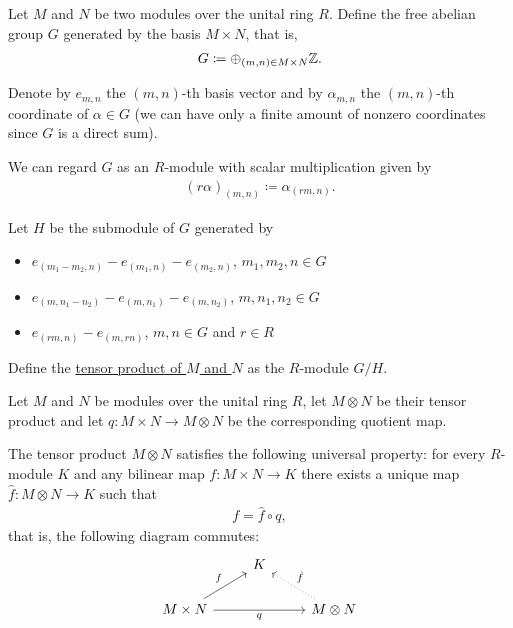 \begin{definition}\label{def:module_tensor_product}\cite[574]{Knapp2016BAlg}
  Let $M$ and $N$ be two modules over the unital ring $R$. Define the free abelian group\label{def:free_abelian_group} $G$ generated by the basis $M \times N$, that is,
  \begin{align*}
    G \coloneqq \oplus_{(m,n) \in M \times N} \mathbb Z.
  \end{align*}

  Denote by $e_{m,n}$ the $(m,n)$-th basis vector and by $\alpha_{m,n}$ the $(m,n)$-th coordinate of $\alpha \in G$ (we can have only a finite amount of nonzero coordinates since $G$ is a direct sum).

  We can regard $G$ as an $R$-module with scalar multiplication given by
  \begin{align*}
    (r \alpha)_{(m,n)} \coloneqq \alpha_{(rm,n)}.
  \end{align*}

  Let $H$ be the submodule of $G$ generated by
  \begin{itemize}
    \item $e_{(m_1 - m_2, n)} - e_{(m_1,n)} - e_{(m_2,n)}$, $m_1, m_2, n \in G$
    \item $e_{(m, n_1 - n_2)} - e_{(m,n_1)} - e_{(m,n_2)}$, $m, n_1, n_2 \in G$
    \item $e_{(rm,n)} - e_{(m,rn)}$, $m, n \in G$ and $r \in R$
  \end{itemize}

  Define the \uline{tensor product of $M$ and $N$} as the $R$-module $G / H$.
\end{definition}

\begin{theorem}\label{thm:tensor_product_universal_property}\cite[theorem 10.18]{Knapp2016BAlg}
  Let $M$ and $N$ be modules over the unital ring $R$, let $M \otimes N$ be their tensor product and let $q: M \times N \to M \otimes N$ be the corresponding quotient map.

  The tensor product $M \otimes N$ satisfies the following universal property: for every $R$-module $K$ and any bilinear map $f: M \times N \to K$ there exists a unique map $\hat f: M \otimes N \to K$ such that
  \begin{align*}
    f = \hat f \circ q,
  \end{align*}
  that is, the following diagram commutes:
  \begin{equation}\label{thm:tensor_product_universal_property/diagram}
    \begin{tikzcd}[baseline=(current bounding box.center)]
                                                  & K & \\
      M \times N \arrow[ru, "f"] \arrow[rr, "q"'] &   & M \otimes N \arrow[lu, "\hat f"', dotted]
    \end{tikzcd}
  \end{equation}
\end{theorem}
